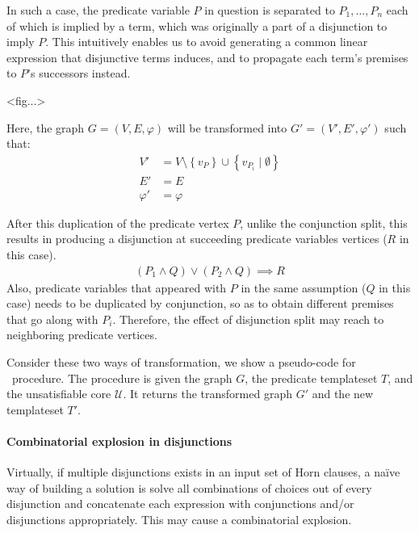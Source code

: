 \documentclass[a4paper,12pt]{article}
\begin{document}
In such a case, the predicate variable $P$ in question is separated to
$P_1, \ldots, P_n$ each of which is implied by a term, which was
originally a part of a disjunction to imply $P$.  This intuitively
enables us to avoid generating a common linear expression that
disjunctive terms induces, and to propagate each term's premises to
$P$'s successors instead.

<fig...>

Here, the graph $G=(V,E,\varphi)$ will be transformed into
$G'=(V',E',\varphi')$ such that:
\begin{align*}
V' & = V \setminus \left\lbrace v_P \right\rbrace \cup
  \left\lbrace v_{P_i} \mid \emptyset \right\rbrace \\
E' & = E \\
\varphi' & = \varphi
\end{align*}

After this duplication of the predicate vertex $P$, unlike the
conjunction split, this results in producing a disjunction at
succeeding predicate variables vertices ($R$ in this case).
\begin{align*}
(P_1 \wedge Q) \vee (P_2 \wedge Q) \implies R
\end{align*}
Also, predicate variables that appeared with $P$ in the same
assumption ($Q$ in this case) needs to be duplicated by conjunction,
so as to obtain different premises that go along with $P_i$.
Therefore, the effect of disjunction split may reach to neighboring
predicate vertices.


Consider these two ways of transformation, we show a pseudo-code for
\transGraph~procedure.  The procedure is given the graph $G$, the
predicate templateset $T$, and the unsatisfiable core
$\mathcal{U}$. It returns the transformed graph $G'$ and the new
templateset $T'$.

\begin{algorithm}
\caption{$ \transGraph (G, T, \mathcal{U}) $}\label{alg:transGraph}
\begin{algorithmic}
\end{algorithmic}
\end{algorithm}


\paragraph{Combinatorial explosion in disjunctions}
Virtually, if multiple disjunctions exists in an input set of Horn
clauses, a na\"{i}ve way of building a solution is solve all
combinations of choices out of every disjunction and concatenate each
expression with conjunctions and/or disjunctions appropriately.  This
may cause a combinatorial explosion.
\end{document}
